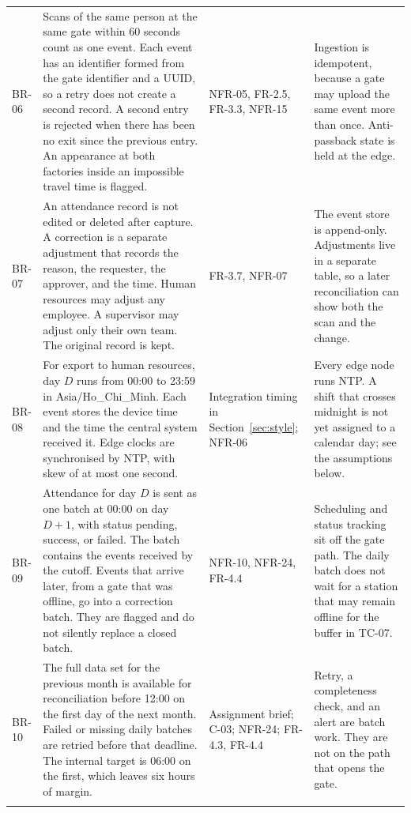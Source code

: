 \begin{longtable}{@{}L{1.25cm}L{5.15cm}L{4.05cm}L{4.15cm}@{}}
\addlinespace
BR-06 &
Scans of the same person at the same gate within 60 seconds count as one event.
Each event has an identifier formed from the gate identifier and a UUID, so a retry does not create a second record.
A second entry is rejected when there has been no exit since the previous entry.
An appearance at both factories inside an impossible travel time is flagged. &
NFR-05, FR-2.5, FR-3.3, NFR-15 &
Ingestion is idempotent, because a gate may upload the same event more than once.
Anti-passback state is held at the edge.\\
\addlinespace
BR-07 &
An attendance record is not edited or deleted after capture.
A correction is a separate adjustment that records the reason, the requester, the approver, and the time.
Human resources may adjust any employee.
A supervisor may adjust only their own team.
The original record is kept. &
FR-3.7, NFR-07 &
The event store is append-only.
Adjustments live in a separate table, so a later reconciliation can show both the scan and the change.\\
\addlinespace
BR-08 &
For export to human resources, day \(D\) runs from 00:00 to 23:59 in Asia/Ho\_Chi\_Minh.
Each event stores the device time and the time the central system received it.
Edge clocks are synchronised by NTP, with skew of at most one second. &
Integration timing in Section~\ref{sec:style}; NFR-06 &
Every edge node runs NTP.
A shift that crosses midnight is not yet assigned to a calendar day; see the assumptions below.\\
\addlinespace
BR-09 &
Attendance for day \(D\) is sent as one batch at 00:00 on day \(D{+}1\), with status pending, success, or failed.
The batch contains the events received by the cutoff.
Events that arrive later, from a gate that was offline, go into a correction batch.
They are flagged and do not silently replace a closed batch. &
NFR-10, NFR-24, FR-4.4 &
Scheduling and status tracking sit off the gate path.
The daily batch does not wait for a station that may remain offline for the buffer in TC-07.\\
\addlinespace
BR-10 &
The full data set for the previous month is available for reconciliation before 12:00 on the first day of the next month.
Failed or missing daily batches are retried before that deadline.
The internal target is 06:00 on the first, which leaves six hours of margin. &
Assignment brief; C-03; NFR-24; FR-4.3, FR-4.4 &
Retry, a completeness check, and an alert are batch work.
They are not on the path that opens the gate.\\
\addlinespace

\end{longtable}
